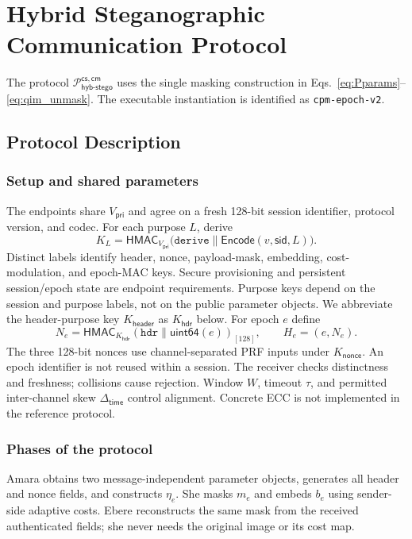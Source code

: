 \documentclass[pdflatex,sn-mathphys-num]{sn-jnl}%
\theoremstyle{definition}
\theoremstyle{game}
\theoremstyle{thmstyleone}%
\theoremstyle{thmstyletwo}%
\theoremstyle{thmstylethree}%
\begin{document}
\section{Hybrid Steganographic Communication Protocol}
\label{Hybrid_Entropy_Steganographic_Communication_Protocol}
The protocol $\mathcal P^{\mathsf{cs,cm}}_{\mathsf{hyb\text{-}stego}}$
uses the single masking construction in Eqs.~\eqref{eq:Pparams}--\eqref{eq:qim_unmask}.
The executable instantiation is identified as \texttt{cpm-epoch-v2}.

\subsection{Protocol Description}\label{proto_Des}
\subsubsection{Setup and shared parameters}\label{sec:ProtocolSetup}
The endpoints share $V_{\mathsf{pri}}$ and agree on a fresh 128-bit
session identifier, protocol version, and codec. For each purpose $L$, derive
\[
K_L=\mathsf{HMAC}_{V_{\mathsf{pri}}}
 \bigl(\texttt{derive}\parallel\mathsf{Encode}(v,\mathsf{sid},L)\bigr).
\]
Distinct labels identify header, nonce, payload-mask, embedding, cost-modulation,
and epoch-MAC keys. Secure provisioning and persistent session/epoch state are
endpoint requirements. Purpose keys depend on the session and purpose labels, not on the public
parameter objects.
We abbreviate the header-purpose key $K_{\mathsf{header}}$
as $K_{\mathsf{hdr}}$ below.
For epoch $e$ define
\[
N_e=\mathsf{HMAC}_{K_{\mathsf{hdr}}}(\texttt{hdr}\parallel\mathsf{uint64}(e))_{[128]},
\qquad H_e=(e,N_e).
\]
The three 128-bit nonces use channel-separated PRF inputs under $K_{\mathsf{nonce}}$.
An epoch identifier is not reused within a session. The receiver checks
distinctness and freshness; collisions cause rejection. Window $W$, timeout
$\tau$, and permitted inter-channel skew $\Delta_{\mathsf{time}}$ control alignment.
Concrete ECC is not implemented in the reference protocol.

\subsubsection{Phases of the protocol}\label{ProtocolPhases}
Amara obtains two message-independent parameter objects, generates all header
and nonce fields, and constructs $\eta_e$. She masks $m_e$ and embeds $b_e$
using sender-side adaptive costs. Ebere reconstructs the same mask from the
received authenticated fields; she never needs the original image or its cost map.
\end{document}
